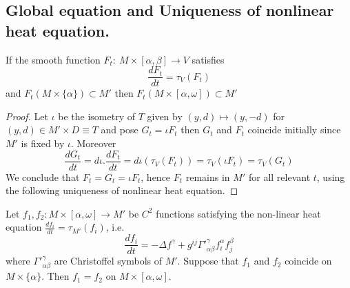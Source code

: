 \subsection{Global equation and Uniqueness of nonlinear heat equation.}
\label{sec:orgc334805}
\begin{theorem}
\label{thm:global-eq}
If the smooth function \(F_t:\ M\times [\alpha,\beta] \longrightarrow V\) satisfies
\begin{equation}
\label{eq:global-heat}
\frac{d F_t}{dt} = \tau_V(F_t)
\end{equation}
and \(F_t(M\times \{\alpha\}) \subset M'\) then \(F_t(M\times[\alpha,\omega])\subset M'\)
\end{theorem}
\begin{proof}
Let \(\iota\) be the isometry of \(T\) given by \((y,d)\mapsto (y,-d)\) for \((y,d)\in M'\times D \equiv T\) 
and pose \(G_t= \iota F_t\) then \(G_t\) and \(F_t\) coincide initially since \(M'\) is
fixed by \(\iota\). Moreover
\[
\frac{d G_t}{d t} = d\iota . \frac{d F_t}{d t} = d\iota (\tau_V(F_t)) = \tau_V(\iota F_t)=\tau_V(G_t)
\]
We conclude that \(F_t = G_t = \iota F_t\), hence \(F_t\) remains in \(M'\) for all
relevant \(t\), using the following uniqueness of nonlinear heat equation.
\end{proof}

\begin{theorem}
\label{thm:unique-nonlinear-heat}
Let \(f_1,f_2: M\times [\alpha,\omega] \longrightarrow M'\) be \(C^2\)
functions satisfying the non-linear heat equation
\(\frac{d f_i}{d t} = \tau_{M'}(f_i)\), i.e.
\[
 \frac{d f_i}{d t} =-\Delta f^\gamma +g^{ij}\Gamma'^{\gamma}_{\alpha\beta} f^{\alpha}_{i}f^{\beta}_{j}
\]
where \(\Gamma'^\gamma_{\alpha\beta}\) are Christoffel symbols of \(M'\). Suppose that
\(f_1\) and \(f_2\) coincide on \(M\times \{\alpha\}\). Then \(f_1=f_2\) on \(M\times[\alpha,\omega]\).
\end{theorem}


